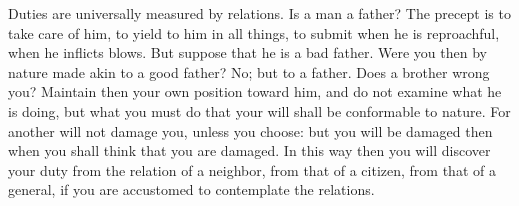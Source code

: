 Duties are universally measured by relations. Is a man a father? The precept is
to take  care of  him, to  yield to  him in all  things, to  submit when  he is
reproachful, when he inflicts blows. But suppose  that he is a bad father. Were
you then  by nature made  akin to a  good father? No; but  to a father.  Does a
brother  wrong you?  Maintain then  your own  position toward  him, and  do not
examine  what he  is  doing, but  what  you must  do that  your  will shall  be
conformable to nature. For another will  not damage you, unless you choose: but
you will be damaged then when you shall think that you are damaged. In this way
then you will discover your duty from  the relation of a neighbor, from that of
a citizen,  from that of  a general, if you  are accustomed to  contemplate the
relations.
